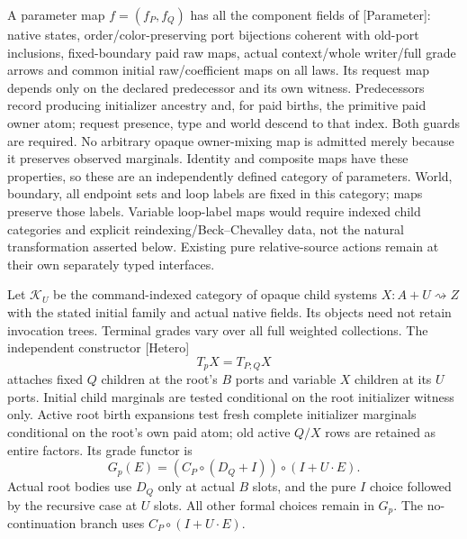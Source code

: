 \documentclass[11pt]{article}
\begin{document}
A parameter map $f=(f_P,f_Q)$ has all the component fields of [Parameter]: native states, order/color-preserving port bijections coherent with old-port inclusions, fixed-boundary paid raw maps, actual context/whole writer/full grade arrows and common initial raw/coefficient maps on all laws. Its request map depends only on the declared predecessor and its own witness. Predecessors record producing initializer ancestry and, for paid births, the primitive paid owner atom; request presence, type and world descend to that index. Both guards are required. No arbitrary opaque owner-mixing map is admitted merely because it preserves observed marginals. Identity and composite maps have these properties, so these are an independently defined category of parameters. World, boundary, all endpoint sets and loop labels are fixed in this category; maps preserve those labels. Variable loop-label maps would require indexed child categories and explicit reindexing/Beck--Chevalley data, not the natural transformation asserted below. Existing pure relative-source actions remain at their own separately typed interfaces.

Let $\mathcal K_U$ be the command-indexed category of opaque child systems $X:A+U\rightsquigarrow Z$ with the stated initial family and actual native fields. Its objects need not retain invocation trees. Terminal grades vary over all full weighted collections. The independent constructor [Hetero]
\[
 T_pX=T_{P;Q}X
\]
attaches fixed $Q$ children at the root's $B$ ports and variable $X$ children at its $U$ ports. Initial child marginals are tested conditional on the root initializer witness only. Active root birth expansions test fresh complete initializer marginals conditional on the root's own paid atom; old active $Q/X$ rows are retained as entire factors. Its grade functor is
\[
 G_p(E)=(C_P\circ(D_Q+I))\circ(I+U\cdot E).
\]
Actual root bodies use $D_Q$ only at actual $B$ slots, and the pure $I$ choice followed by the recursive case at $U$ slots. All other formal choices remain in $G_p$. The no-continuation branch uses $C_P\circ(I+U\cdot E)$.
\end{document}
